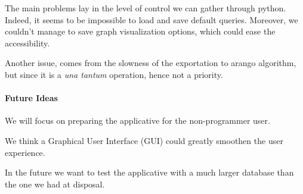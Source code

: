 \documentclass[11pt,twocolumn]{article}
\begin{document}
The main problems lay in the level of control we can gather through python. Indeed, it seems to be impossible to load and save default queries.
Moreover, we couldn't manage to save graph visualization options, which could ease the accessibility.

Another issue, comes from the slowness of the exportation to arango algorithm, but since it is a \textit{una tantum} operation, hence not a priority.

\paragraph{Future Ideas}

We will focus on preparing the applicative for the non-programmer user.

We think a Graphical User Interface (GUI) could greatly smoothen the user experience.

In the future we want to test the applicative with a much larger database than the one we had at disposal.

\twocolumn[
\begin{@twocolumnfalse}


\end{@twocolumnfalse}
]
\end{document}
